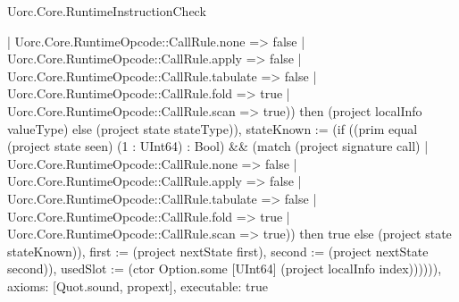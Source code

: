 \begin{lexlean}{Uorc.Core.RuntimeInstructionCheck}
\begin{semanticmodule}
{{{      | Uorc.Core.RuntimeOpcode::CallRule.none => false
      | Uorc.Core.RuntimeOpcode::CallRule.apply => false
      | Uorc.Core.RuntimeOpcode::CallRule.tabulate => false
      | Uorc.Core.RuntimeOpcode::CallRule.fold => true
      | Uorc.Core.RuntimeOpcode::CallRule.scan => true)) then (project localInfo valueType) else (project state stateType)), stateKnown := (if ((prim equal (project state seen) (1 : UInt64) : Bool) && (match (project signature call)
      | Uorc.Core.RuntimeOpcode::CallRule.none => false
      | Uorc.Core.RuntimeOpcode::CallRule.apply => false
      | Uorc.Core.RuntimeOpcode::CallRule.tabulate => false
      | Uorc.Core.RuntimeOpcode::CallRule.fold => true
      | Uorc.Core.RuntimeOpcode::CallRule.scan => true)) then true else (project state stateKnown)), first := (project nextState first), second := (project nextState second)}), usedSlot := (ctor Option.some [UInt64] (project localInfo index))})))),
  axioms: [Quot.sound, propext],
  executable: true
}


\end{semanticmodule}
\end{lexlean}
